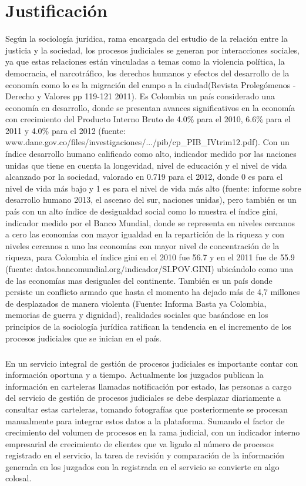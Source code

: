 \chapter{Justificaci\'on}
\label{sec:justificacion}
Seg\'un la sociolog\'ia jur\'idica, rama encargada del estudio de la relaci\'on
entre la justicia y la sociedad, los procesos judiciales se generan por
interacciones sociales, ya que estas relaciones est\'an vinculadas a temas
como la violencia pol\'itica, la democracia, el narcotr\'afico, los derechos
humanos y efectos del desarrollo de la econom\'ia como lo es la migraci\'on
del campo a la ciudad(Revista Proleg\'omenos - Derecho y Valores pp 119-121 2011). 
Es Colombia un pa\'is considerado una econom\'ia en desarrollo, donde se presentan
avances significativos en la econom\'ia con crecimiento del Producto 
Interno Bruto de 4.0\% para el 2010, 6.6\% para el 2011 y 4.0\% para el 2012 
(fuente: www.dane.gov.co/files/investigaciones/.../pib/cp_PIB_IVtrim12.pdf). 
Con un \'indice desarrollo humano calificado como alto, indicador medido 
por las naciones unidas que tiene en cuenta la longevidad, nivel de 
educaci\'on y el nivel de vida alcanzado por la sociedad, valorado en 
0.719 para el 2012, donde 0 es para el nivel de vida m\'as bajo y 1 es 
para el nivel de vida m\'as alto (fuente: informe sobre desarrollo humano
2013, el ascenso del sur, naciones unidas), pero tambi\'en es un pa\'is con
un alto \'indice de desigualdad social como lo muestra el \'indice gini, 
indicador medido por el Banco Mundial, donde se representa en niveles 
cercanos a cero las econom\'ias con mayor igualdad en la repartici\'on de 
la riqueza y con niveles cercanos a uno las econom\'ias con mayor nivel 
de concentraci\'on de la riqueza, para Colombia el \'indice gini en el 2010 
fue 56.7 y en el 2011 fue de 55.9 
(fuente: datos.bancomundial.org/indicador/SI.POV.GINI‎) ubic\'andolo como 
una de las econom\'ias mas desiguales del continente. Tambi\'en es un pa\'is 
donde persiste un conflicto armado que hasta el momento ha dejado m\'as 
de 4,7 millones de desplazados de manera violenta 
(Fuente: Informa Basta ya Colombia, memorias de guerra y dignidad), 
realidades sociales que bas\'andose en los principios de la sociolog\'ia 
jur\'idica ratifican la tendencia en el incremento de los procesos 
judiciales que se inician en el pa\'is.
\paragraph{}
En un servicio integral de gesti\'on de procesos judiciales es importante
contar con informaci\'on oportuna y a tiempo. Actualmente los juzgados 
publican la informaci\'on en carteleras llamadas notificaci\'on por estado,
las personas a cargo del servicio de gesti\'on de procesos judiciales se 
debe desplazar diariamente a consultar estas carteleras, tomando 
fotograf\'ias que posteriormente se procesan manualmente para integrar 
estos datos a la plataforma. Sumando el factor de crecimiento del 
volumen de procesos en la rama judicial, con un indicador interno 
empresarial de crecimiento de clientes que va ligado al n\'umero de 
procesos registrado en el servicio, la tarea de revisi\'on y comparaci\'on 
de la informaci\'on generada en los juzgados con la registrada en el 
servicio se convierte en algo colosal.
\pagebreak
